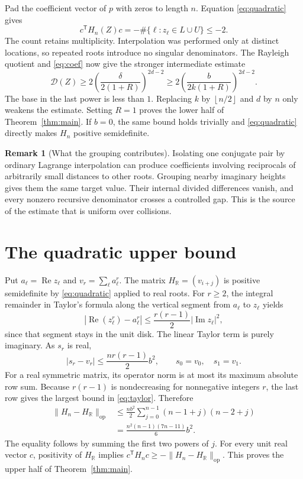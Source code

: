 \documentclass[11pt]{article}
\theoremstyle{definition}
\newtheorem{remark}[theorem]{Remark}
\newcommand{\R}{\mathbb R}
\newcommand{\Repart}{\operatorname{Re}}
\newcommand{\Impart}{\operatorname{Im}}
\newcommand{\defect}{\mathcal D}
\newcommand{\floor}[1]{\left\lfloor#1\right\rfloor}
\begin{document}
Pad the coefficient vector of $p$ with zeros to length $n$. Equation
\eqref{eq:quadratic} gives
\begin{equation}
 c^{\mathsf T}H_n(Z)c
 =-\#\{\ell:z_\ell\in L\cup U\}\leq-2.
 \label{eq:witness}
\end{equation}
The count retains multiplicity. Interpolation was performed only at distinct
locations, so repeated roots introduce no singular denominators.
The Rayleigh quotient and \eqref{eq:coef} now give the stronger intermediate
estimate
\begin{equation}
 \defect(Z)\geq
 2\left(\frac{\delta}{2(1+R)}\right)^{2d-2}
 \geq2\left(\frac{b}{2k(1+R)}\right)^{2d-2}.
 \label{eq:generalradius}
\end{equation}
The base in the last power is less than $1$. Replacing $k$ by
$\floor{n/2}$ and $d$ by $n$ only weakens the estimate. Setting $R=1$
proves the lower half of Theorem~\ref{thm:main}. If $b=0$, the same bound
holds trivially and \eqref{eq:quadratic} directly makes $H_n$ positive
semidefinite.

\begin{remark}[What the grouping contributes]
Isolating one conjugate pair by ordinary Lagrange interpolation can produce
coefficients involving reciprocals of arbitrarily small distances to other
roots. Grouping nearby imaginary heights gives them the same target value.
Their internal divided differences vanish, and every nonzero recursive
denominator crosses a controlled gap. This is the source of the estimate
that is uniform over collisions.
\end{remark}

\section{The quadratic upper bound}

Put $a_\ell=\Repart z_\ell$ and $v_r=\sum_\ell a_\ell^r$. The matrix
$H_{\R}=(v_{i+j})$ is positive semidefinite by
\eqref{eq:quadratic} applied to real roots.
For $r\geq2$, the integral remainder in Taylor's formula along the vertical
segment from $a_\ell$ to $z_\ell$ yields
\[
 |\Repart(z_\ell^r)-a_\ell^r|
 \leq \frac{r(r-1)}2 |\Impart z_\ell|^2,
\]
since that segment stays in the unit disk. The linear Taylor term is purely
imaginary. As $s_r$ is real,
\begin{equation}
 |s_r-v_r|\leq\frac{n r(r-1)}2 b^2,
 \qquad s_0=v_0,\quad s_1=v_1.
 \label{eq:taylor}
\end{equation}
For a real symmetric matrix, its operator norm is at most its maximum
absolute row sum. Because $r(r-1)$ is nondecreasing for nonnegative integers
$r$, the last row gives the largest bound in \eqref{eq:taylor}. Therefore
\[
 \begin{split}
 \|H_n-H_{\R}\|_{\mathrm{op}}
 &\leq\frac{n b^2}{2}
 \sum_{j=0}^{n-1}(n-1+j)(n-2+j)\\
 &=\frac{n^2(n-1)(7n-11)}6 b^2.
 \end{split}
\]
The equality follows by summing the first two powers of $j$.
For every unit real vector $c$, positivity of $H_{\R}$ implies
$c^{\mathsf T}H_nc\geq-\|H_n-H_{\R}\|_{\mathrm{op}}$.
This proves the upper half of Theorem~\ref{thm:main}.
\end{document}

